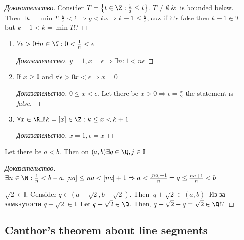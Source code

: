 \begin{proof}[Доказательство]
	Consider $T = \left\{ t \in \Z: \frac{y}{x} \leq t \right \} $. $T \neq \emptyset \ \& \ $ is bounded below. Then $\exists k = \min T: \frac{y}{x} < k \Rightarrow y < kx \Rightarrow k-1 \leq \frac{y}{x}$, cuz if it's false then $k-1 \in T$ but $k-1 < k = \min T!?$
\end{proof}

\begin{corollary}[]
	\begin{enumerate}
		\item $\forall \epsilon > 0 \exists n \in \N: 0 < \frac{1}{n} < \epsilon$
			\begin{proof}[Доказательство]
				$y = 1, x = \epsilon \Rightarrow \exists n: 1 < n\epsilon$
			\end{proof}
		\item If $x \geq  0$ and $\forall \epsilon > 0 x < \epsilon \Rightarrow x = 0$ 
			\begin{proof}[Доказательство]
				$0 \leq x < \epsilon$. Let there be $x > 0 \Rightarrow \epsilon = \frac{x}{2}$ the statement is \textit{false}.
			\end{proof}
		\item $\forall x \in \R \exists ! k = [x] \in \Z: k \leq x < k+1$ 
			\begin{proof}[Доказательство]
				$x = 1, \epsilon = x$
			\end{proof}
	\end{enumerate}
\end{corollary}

\begin{lemma}
	Let there be $a < b$. Then on $(a, b) \exists q \in \Q, j \in \mathbb{I}$ 
\end{lemma}

\begin{proof}[Доказательство]
	$\exists n \in \N: \frac{1}{n} < b-a, [na] \leq na < [na] + 1 \Rightarrow a < \frac{[na] + 1}{n} = q \leq \frac{n a + 1}{n} < b$

	$\sqrt{2} \in \mathbb{I}$. Consider $q \in (a - \sqrt{2}, b - \sqrt{2})$. Then, $q + \sqrt{2} \in (a, b)$. Из-за замкнутости $q  +\sqrt{2} \in \mathbb{I}$. Let $q + \sqrt{2} \in \Q$. Then, $q + \sqrt{2} - q = \sqrt{2} \in \Q !?$
\end{proof}

\subsection{Canthor's theorem about line segments}

